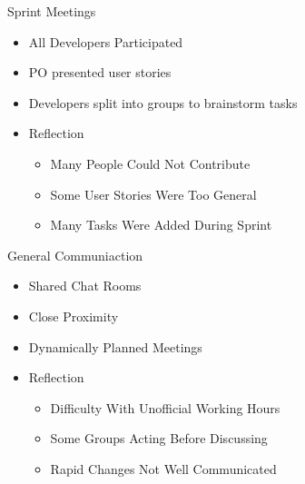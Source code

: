 \begin{frame}{Sprint Meetings}
\begin{itemize} 
	\item All Developers Participated 
	\item PO presented user stories
    \item Developers split into groups to brainstorm tasks
	\item Reflection
		\begin{itemize}
		    \item Many People Could Not Contribute
		    \item Some User Stories Were Too General
		    \item Many Tasks Were Added During Sprint
		\end{itemize}
\end{itemize}
\end{frame}

\begin{frame}{General Communiaction}
\begin{itemize} 
	\item Shared Chat Rooms
	\item Close Proximity
	\item Dynamically Planned Meetings
	\item Reflection
		\begin{itemize}
		    \item Difficulty With Unofficial Working Hours
		    \item Some Groups Acting Before Discussing
		    \item Rapid Changes Not Well Communicated
		\end{itemize}
\end{itemize}
\end{frame}
